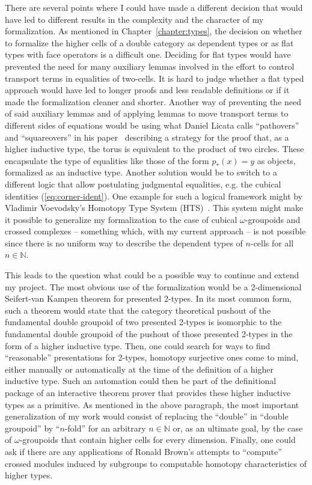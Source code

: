 There are several points where I could have made a different decision that would
have led to different results in the complexity and the character of my formalization.
As mentioned in Chapter~\ref{chapter:types}, the decision on whether to formalize
the higher cells of a double category as dependent types or as flat types with
face operators is a difficult one.
Deciding for flat types would have prevented the need for many auxiliary lemmas
involved in the effort to control transport terms in equalities of two-cells.
It is hard to judge whether a flat typed approach would have led to longer proofs
and less readable definitions or if it made the formalization cleaner and shorter.
Another way of preventing the need of said auxiliary lemmas and of applying lemmas
to move transport terms to different sides of equations would be using what Daniel
Licata calls ``pathovers'' and ``squareovers'' in his paper~\cite{licatacubical}
describing a strategy for the proof that, as a higher inductive type, the torus
is equivalent to the product of two circles.
These encapsulate the type of equalities like those of the form $p_*(x) = y$ as objects,
formalized as an inductive type. %
Another solution would be to switch to a different logic that allow postulating
judgmental equalities, e.g. the cubical identities (\ref{eq:corner-ident}).
One example for such a logical framework might by Vladimir Voevodsky's
Homotopy Type System (HTS)~\cite{hts}.
This system might make it possible to generalize my formalization to the case
of cubical $\omega$-groupoids and crossed complexes -- something which, with my
current approach -- is not possible since there is no uniform way to describe the
dependent types of $n$-cells for all $n \in \mathbb{N}$.

This leads to the question what could be a possible way to continue and extend
my project.
The most obvious use of the formalization would be a 2-dimensional Seifert-van
Kampen theorem for presented 2-types.
In its most common form, such a theorem would state that the category
theoretical pushout of the fundamental double groupoid of two presented 2-types
is isomorphic to the fundamental double groupoid of the pushout of those presented
2-types in the form of a higher inductive type.
Then, one could search for ways to find ``reasonable'' presentations for 2-types,
homotopy surjective ones come to mind, either manually or automatically at the
time of the definition of a higher inductive type.
Such an automation could then be part of the definitional package of an interactive
theorem prover that provides these higher inductive types as a primitive.
As mentioned in the above paragraph, the most important generalization of my work
would consist of replacing the ``double'' in ``double groupoid'' by ``$n$-fold''
for an arbitrary $n \in \mathbb{N}$ or, as an ultimate goal, by the case of
$\omega$-groupoids that contain higher cells for every dimension.
Finally, one could ask if there are any applications of Ronald Brown's attempts
to ``compute'' crossed modules induced by subgroups \cite{brown1996computing}
to computable homotopy characteristics of higher types.




